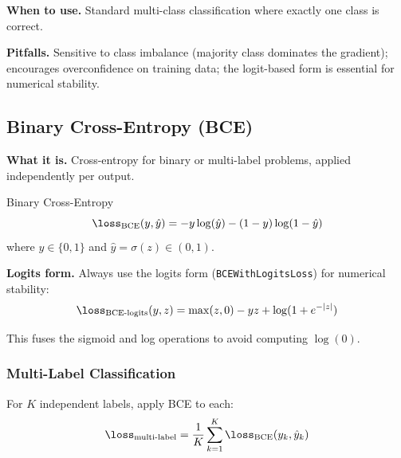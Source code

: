 \textbf{When to use.} Standard multi-class classification where exactly one class is correct.

\textbf{Pitfalls.} Sensitive to class imbalance (majority class dominates the gradient); encourages overconfidence on training data; the logit-based form is essential for numerical stability.

\subsection{Binary Cross-Entropy (BCE)}

\textbf{What it is.} Cross-entropy for binary or multi-label problems, applied independently per output.

\begin{mathresult}{Binary Cross-Entropy}
\begin{equation}
\loss_{\text{BCE}}(y, \hat{y}) = -y \log(\hat{y}) - (1-y) \log(1-\hat{y})
\end{equation}
where $y \in \{0, 1\}$ and $\hat{y} = \sigma(z) \in (0, 1)$.
\end{mathresult}

\textbf{Logits form.} Always use the logits form (\texttt{BCEWithLogitsLoss}) for numerical stability:
\begin{equation}
\loss_{\text{BCE-logits}}(y, z) = \max(z, 0) - yz + \log(1 + e^{-|z|})
\end{equation}

This fuses the sigmoid and log operations to avoid computing $\log(0)$.

\subsubsection{Multi-Label Classification}

For $K$ independent labels, apply BCE to each:
\begin{equation}
\loss_{\text{multi-label}} = \frac{1}{K}\sum_{k=1}^{K} \loss_{\text{BCE}}(y_k, \hat{y}_k)
\end{equation}

